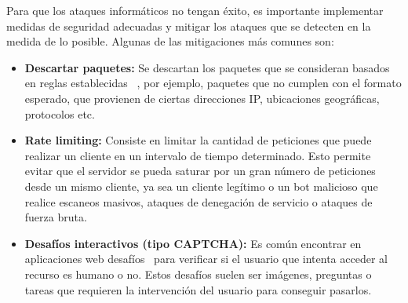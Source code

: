 Para que los ataques informáticos no tengan éxito, es importante implementar medidas de seguridad adecuadas y mitigar los ataques que se detecten en la medida de lo posible. 
Algunas de las mitigaciones más comunes son:
\begin{itemize}
	\item \textbf{Descartar paquetes:} Se descartan los paquetes que se consideran basados en reglas establecidas~\cite{Yungaicela-Naula2022, Liu2018} , por ejemplo, paquetes que no cumplen con el formato esperado, que provienen de ciertas direcciones IP, ubicaciones geográficas, protocolos etc. 

    \item \textbf{Rate limiting:} Consiste en limitar la cantidad de peticiones que puede realizar un cliente en un intervalo de tiempo determinado. Esto permite evitar que el servidor se pueda saturar por un gran número de peticiones desde un mismo cliente, ya sea un cliente legítimo o un bot malicioso que realice escaneos masivos, ataques de denegación de servicio o ataques de fuerza bruta.

    \item \textbf{Desafíos interactivos (tipo CAPTCHA):} Es común encontrar en aplicaciones web desafíos~\cite{CloudflareDocsTeam2025} para verificar si el usuario que intenta acceder al recurso es humano o no. Estos desafíos suelen ser imágenes, preguntas o tareas que requieren la intervención del usuario para conseguir pasarlos.
\end{itemize}